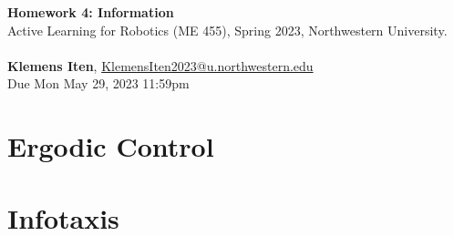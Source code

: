 \documentclass[letterpaper, 12pt]{article}
\begin{document}

\large\textbf{Homework 4: Information} \\  
\normalsize Active Learning for Robotics (ME 455), Spring 2023, Northwestern University.
\\ \\
\normalsize\textbf{Klemens Iten}, \href{mailto:KlemensIten2023@u.northwestern.edu}{KlemensIten2023@u.northwestern.edu}\\
\normalsize   Due Mon May 29, 2023 11:59pm

\section{Ergodic Control}

\clearpage
\section{Infotaxis}


% 
% 
\end{document}
